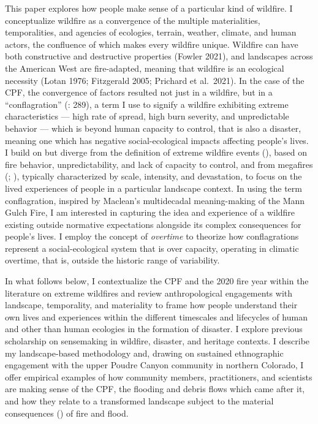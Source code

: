 \documentclass[
]{article}
\begin{document}
This paper explores how people make sense of a particular kind of wildfire. I conceptualize wildfire as a convergence of the multiple materialities, temporalities, and agencies of ecologies, terrain, weather, climate, and human actors, the confluence of which makes every wildfire unique. Wildfire can have both constructive and destructive properties (Fowler 2021), and landscapes across the American West are fire-adapted, meaning that wildfire is an ecological necessity (Lotan 1976; Fitzgerald 2005; Prichard et al.~2021). In the case of the CPF, the convergence of factors resulted not just in a wildfire, but in a ``conflagration'' (: 289), a term I use to signify a wildfire exhibiting extreme characteristics --- high rate of spread, high burn severity, and unpredictable behavior --- which is beyond human capacity to control, that is also a disaster, meaning one which has negative social-ecological impacts affecting people's lives. I build on but diverge from the definition of extreme wildfire events (), based on fire behavior, unpredictability, and lack of capacity to control, and from megafires (; ), typically characterized by scale, intensity, and devastation, to focus on the lived experiences of people in a particular landscape context. In using the term conflagration, inspired by Maclean's multidecadal meaning-making of the Mann Gulch Fire, I am interested in capturing the idea and experience of a wildfire existing outside normative expectations alongside its complex consequences for people's lives. I employ the concept of \emph{overtime} to theorize how conflagrations represent a social-ecological system that is over capacity, operating in climatic overtime, that is, outside the historic range of variability.

In what follows below, I contextualize the CPF and the 2020 fire year within the literature on extreme wildfires and review anthropological engagements with landscape, temporality, and materiality to frame how people understand their own lives and experiences within the different timescales and lifecycles of human and other than human ecologies in the formation of disaster. I explore previous scholarship on sensemaking in wildfire, disaster, and heritage contexts. I describe my landscape-based methodology and, drawing on sustained ethnographic engagement with the upper Poudre Canyon community in northern Colorado, I offer empirical examples of how community members, practitioners, and scientists are making sense of the CPF, the flooding and debris flows which came after it, and how they relate to a transformed landscape subject to the material consequences () of fire and flood.
\end{document}
